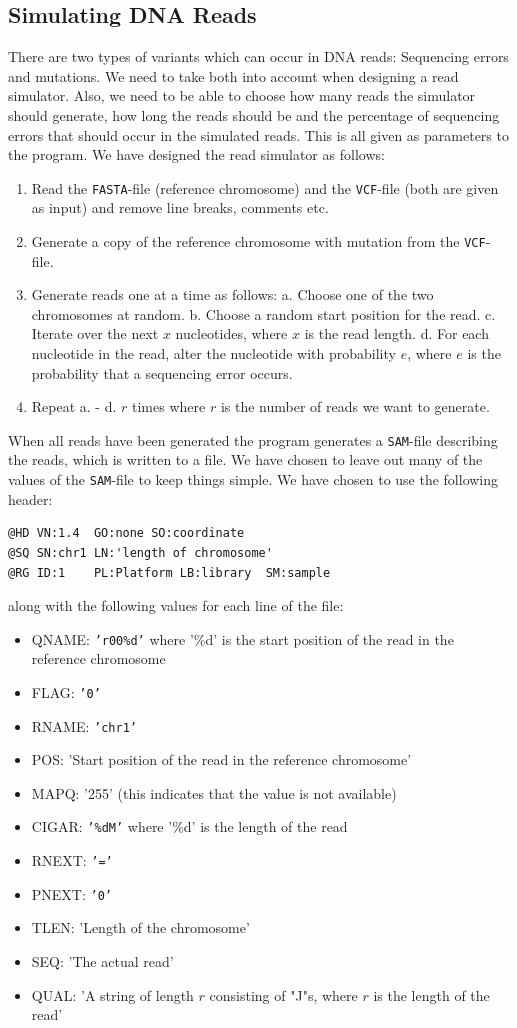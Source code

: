\documentclass[10pt,a4paper]{article}
\begin{document}
\subsection{Simulating DNA Reads}
There are two types of variants which can occur in DNA reads: Sequencing errors and mutations. We need to take both into account when designing a read simulator. Also, we need to be able to choose how many reads the simulator should generate, how long the reads should be and the percentage of sequencing errors that should occur in the simulated reads. This is all given as parameters to the program. We have designed the read simulator as follows:
\begin{enumerate}
\item Read the \texttt{FASTA}-file (reference chromosome) and the \texttt{VCF}-file (both are given as input) and remove line breaks, comments etc.
\item Generate a copy of the reference chromosome with mutation from the \texttt{VCF}-file.
\item Generate reads one at a time as follows:
\subitem a. Choose one of the two chromosomes at random.
\subitem b. Choose a random start position for the read.
\subitem c. Iterate over the next $x$ nucleotides, where $x$ is the read length.
\subitem d. For each nucleotide in the read, alter the nucleotide with probability $e$, where $e$ is the probability that a sequencing error occurs.
\item Repeat a. - d.  $r$ times where $r$ is the number of reads we want to generate.
\end{enumerate}
When all reads have been generated the program generates a \texttt{SAM}-file describing the reads, which is written to a file. We have chosen to leave out many of the values of the \texttt{SAM}-file to keep things simple. We have chosen to use the following header:
\begin{lstlisting}
@HD	VN:1.4	GO:none	SO:coordinate
@SQ	SN:chr1	LN:'length of chromosome'
@RG	ID:1	PL:Platform	LB:library	SM:sample
\end{lstlisting}
along with the following values for each line of the file:
\begin{itemize}
\item QNAME: \texttt{'r00\%d'} where '\%d' is the start position of the read in the reference chromosome
\item FLAG: \texttt{'0'}
\item RNAME: \texttt{'chr1'}
\item POS: 'Start position of the read in the reference chromosome'
\item MAPQ: '255' (this indicates that the value is not available)
\item CIGAR: \texttt{'\%dM'} where '\%d' is the length of the read
\item RNEXT: \texttt{'='}
\item PNEXT: \texttt{'0'}
\item TLEN: 'Length of the chromosome'
\item SEQ: 'The actual read'
\item QUAL: 'A string of length $r$ consisting of "J"s, where $r$ is the length of the read'
\end{itemize} 
\end{document}
